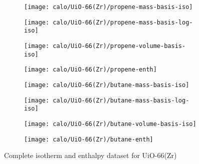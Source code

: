 \begin{figure}[H]
    \begin{subfigure}{0.25\textwidth}
        \texttt{[image: calo/UiO-66(Zr)/propene-mass-basis-iso]}%
        \label{appx:fig:shaping:uio66c3h6mass}
    \end{subfigure}%
    \begin{subfigure}{0.25\textwidth}
        \texttt{[image: calo/UiO-66(Zr)/propene-mass-basis-log-iso]}%
        \label{appx:fig:shaping:uio66c3h6masslog}
    \end{subfigure}%
    \begin{subfigure}{0.25\textwidth}
        \texttt{[image: calo/UiO-66(Zr)/propene-volume-basis-iso]}%
        \label{appx:fig:shaping:uio66c3h6volume}
    \end{subfigure}%
    \begin{subfigure}{0.25\textwidth}
        \texttt{[image: calo/UiO-66(Zr)/propene-enth]}%
        \label{appx:fig:shaping:uio66c3h6enth}%
    \end{subfigure}%

    \begin{subfigure}{0.25\textwidth}
        \texttt{[image: calo/UiO-66(Zr)/butane-mass-basis-iso]}%
        \label{appx:fig:shaping:uio66c4h10mass}
    \end{subfigure}%
    \begin{subfigure}{0.25\textwidth}
        \texttt{[image: calo/UiO-66(Zr)/butane-mass-basis-log-iso]}%
        \label{appx:fig:shaping:uio66c4h10masslog}
    \end{subfigure}%
    \begin{subfigure}{0.25\textwidth}
        \texttt{[image: calo/UiO-66(Zr)/butane-volume-basis-iso]}%
        \label{appx:fig:shaping:uio66c4h10volume}
    \end{subfigure}%
    \begin{subfigure}{0.25\textwidth}
        \texttt{[image: calo/UiO-66(Zr)/butane-enth]}%
        \label{appx:fig:shaping:uio66c4h10enth}%
    \end{subfigure}%

    \caption{Complete isotherm and enthalpy dataset for UiO-66(Zr)}%
    \label{appx:fig:shaping:calouio66}
\end{figure}
